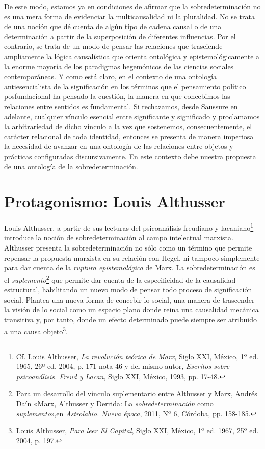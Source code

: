 De este modo, estamos ya en condiciones de afirmar que la sobredeterminación no es una mera forma de evidenciar la multicausalidad ni la pluralidad. No se trata de una noción que dé cuenta de algún tipo de cadena causal o de una determinación a partir de la superposición de diferentes influencias. Por el contrario, se trata de un modo de pensar las relaciones que trasciende ampliamente la lógica causalística que orienta ontológica y epistemológicamente a la enorme mayoría de los paradigmas hegemónicos de las ciencias sociales contemporáneas. Y como está claro, en el contexto de una ontología antiesencialista de la significación en los términos que el pensamiento político posfundacional ha pensado la cuestión, la manera en que concebimos las relaciones entre sentidos es fundamental. Si rechazamos, desde Saussure en adelante, cualquier vínculo esencial entre significante y significado y proclamamos la arbitrariedad de dicho vínculo a la vez que sostenemos, consecuentemente, el carácter relacional de toda identidad, entonces se presenta de manera imperiosa la necesidad de avanzar en una ontología de las relaciones entre objetos y prácticas configuradas discursivamente. En este contexto debe nuestra propuesta de una ontología de la sobredeterminación.


\section{Protagonismo: Louis Althusser}

Louis Althusser, a partir de sus lecturas del psicoanálisis freudiano y lacaniano\footnote{Cf. Louis Althusser, \emph{La revolución teórica de Marx}, Siglo XXI, México, 1º ed. 1965, 26º ed. 2004, p. 171 nota 46 y del mismo autor, \emph{Escritos sobre psicoanálisis. Freud y Lacan}, Siglo XXI, México, 1993, pp. 17-48.} introduce la noción de sobredeterminación al campo intelectual marxista. Althusser presenta la sobredeterminación no sólo como un término que permite repensar la propuesta marxista en su relación con Hegel, ni tampoco simplemente para dar cuenta de la \emph{ruptura epistemológica} de Marx. La sobredeterminación es el \emph{suplemento}\footnote{Para un desarrollo del vínculo suplementario entre Althusser y Marx, Andrés Daín «Marx, Althusser y Derrida: La \emph{sobredeterminación} como \emph{suplemento}»,en \emph{Astrolabio. Nueva época}, 2011, Nº 6, Córdoba, pp. 158-185.} que permite dar cuenta de la especificidad de la causalidad estructural, habilitando un nuevo modo de pensar todo proceso de significación social. Plantea una nueva forma de concebir lo social, una manera de trascender la visión de lo social como un espacio plano donde reina una causalidad mecánica transitiva y, por tanto, donde un efecto determinado puede siempre ser atribuido a una causa objeto\footnote{Louis Althusser, \emph{Para leer El Capital}, Siglo XXI, México, 1º ed. 1967, 25º ed. 2004, p. 197.}.

